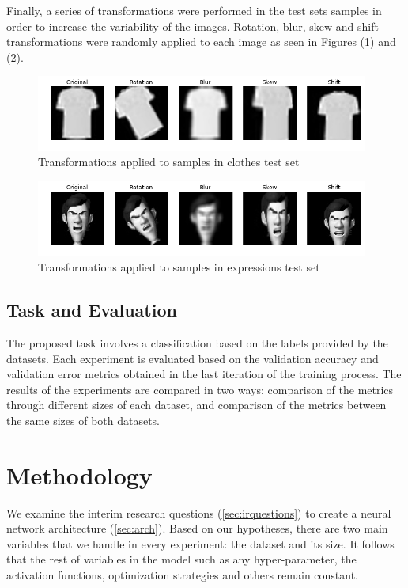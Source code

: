 \documentclass{article}
\begin{document}
Finally, a series of transformations were performed in the test sets samples in order to increase the variability of the images. Rotation, blur, skew and shift transformations were randomly applied to each image as seen in Figures (\ref{fig:3}) and (\ref{fig:4}).

\begin{figure}[!htb]
    \vskip 5mm
        \begin{center}
            \includegraphics[height=2.5cm]{augmented_clothes}
            \caption{Transformations applied to samples in clothes test set}
            \label{fig:3}
        \end{center}
    \vskip -5mm
\end{figure}

\begin{figure}[!htb]
    \vskip 5mm
        \begin{center}
            \includegraphics[height=2.5cm]{augmented_expressions}
            \caption{Transformations applied to samples in expressions test set}
            \label{fig:4}
        \end{center}
    \vskip -5mm
\end{figure}

\subsection{Task and Evaluation}
\label{sec:evaluation}
The proposed task involves a classification based on the labels provided by the datasets. Each experiment is evaluated based on the validation accuracy and validation error metrics obtained in the last iteration of the training process. The results of the experiments are compared in two ways: comparison of the metrics through different sizes of each dataset, and comparison of the metrics between the same sizes of both datasets.

\section{Methodology}
\label{sec:methodology}
We examine the interim research questions (\ref{sec:irquestions}) to create a neural network architecture (\ref{sec:arch}). Based on our hypotheses, there are two main variables that we handle in every experiment: the dataset and its size. It follows that the rest of variables in the model such as any hyper-parameter, the activation functions, optimization strategies and others remain constant.
\end{document}
